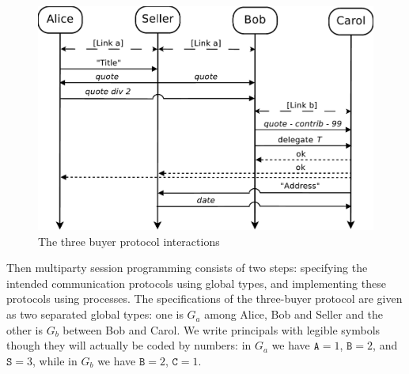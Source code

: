 \documentclass{article}
\newcommand{\participant}[1]{\ensuremath{\mathtt{#1}}}
\begin{document}
\begin{figure}[tb]
\begin{center}
\includegraphics[scale=0.25]{three_buyer_protocol}
\end{center}
\caption{The three buyer protocol interactions}\label{fig:threebuyers}
\end{figure}

Then multiparty session programming consists of two steps:
specifying the intended communication protocols using global types,
and implementing these protocols using processes. The specifications
of the three-buyer protocol are given as two separated global types:
one is $G_a$  among Alice, Bob and Seller and the other is $G_b$
between Bob and Carol. We write principals with legible symbols
though they will actually be coded by numbers: in $G_a$
we have  $\participant{A}=1$,
$\participant{B}=2$, and $\participant{S}=3$,
while in $G_b$ we have $\participant{B}=2$, $\participant{C}=1$.\\[0.5mm]
\newcommand{\nm}[1]{{\texttt{\scriptsize #1.}}}
\end{document}
